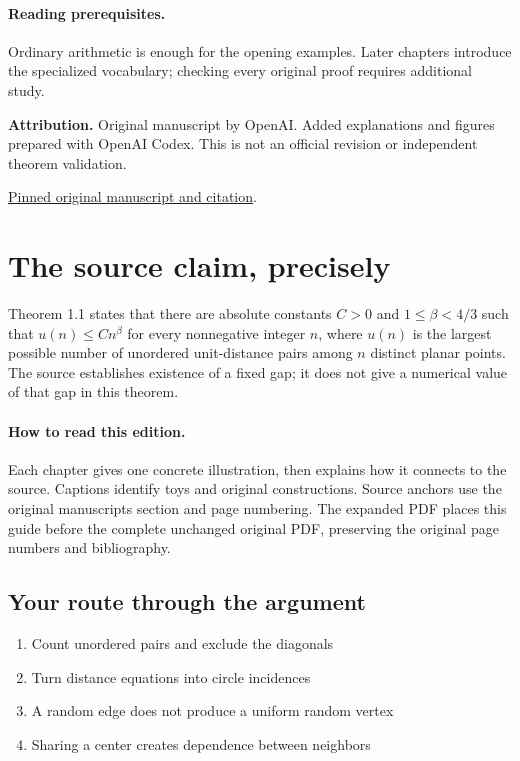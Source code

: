 \documentclass[11pt]{article}
\begin{document}
\paragraph{Reading prerequisites.} Ordinary arithmetic is enough for the opening examples. Later chapters introduce the specialized vocabulary; checking every original proof requires additional study.\par\textbf{Attribution.} Original manuscript by OpenAI. Added explanations and figures prepared with OpenAI Codex. This is not an official revision or independent theorem validation.\par\href{https://github.com/openai/math/tree/1581d4cbdd69a0faf34b2089614fe2a814316a6a/preprints/A-power-saving-for-planar-unit-distances-September-23-2026}{Pinned original manuscript and citation}.\newpage\section*{The source claim, precisely}Theorem 1.1 states that there are absolute constants $C>0$ and $1\le\beta<4/3$ such that $u(n)\le Cn^\beta$ for every nonnegative integer $n$, where $u(n)$ is the largest possible number of unordered unit-distance pairs among $n$ distinct planar points. The source establishes existence of a fixed gap; it does not give a numerical value of that gap in this theorem.\paragraph{How to read this edition.} Each chapter gives one concrete illustration, then explains how it connects to the source. Captions identify toys and original constructions. Source anchors use the original manuscript\textquotesingle s section and page numbering. The expanded PDF places this guide before the complete unchanged original PDF, preserving the original page numbers and bibliography.\subsection*{Your route through the argument}\begin{enumerate}\item Count unordered pairs and exclude the diagonals
\item Turn distance equations into circle incidences
\item A random edge does not produce a uniform random vertex
\item Sharing a center creates dependence between neighbors

\end{enumerate}
\end{document}
